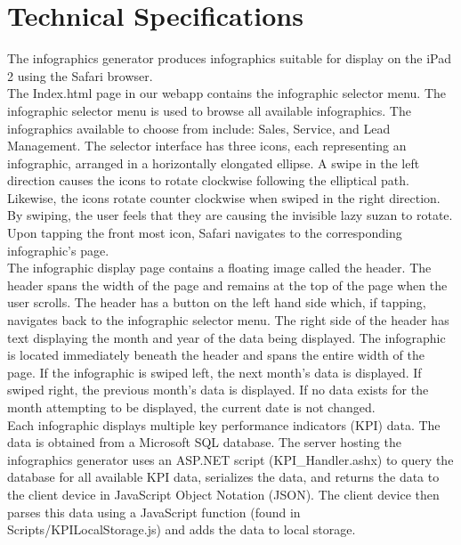 \documentclass[11pt,a4paper,oneside]{article}
\begin{document}
\section{Technical Specifications}

The infographics generator produces infographics suitable for display on the iPad 2 using the Safari browser.\\

The Index.html page in our webapp contains the infographic selector menu. The infographic selector menu is used to browse all available infographics. The infographics available to choose from include: Sales, Service, and Lead Management. The selector interface has three icons, each representing an infographic, arranged in a horizontally elongated ellipse. A swipe in the left direction causes the icons to rotate clockwise following the elliptical path. Likewise, the icons rotate counter clockwise when swiped in the right direction. By swiping, the user feels that they are causing the invisible lazy suzan to rotate. Upon tapping the front most icon, Safari navigates to the corresponding infographic's page.\\

The infographic display page contains a floating image called the header. The header spans the width of the page and remains at the top of the page when the user scrolls. The header has a button on the left hand side which, if tapping, navigates back to the infographic selector menu. The right side of the header has text displaying the month and year of the data being displayed. The infographic is located immediately beneath the header and spans the entire width of the page. If the infographic is swiped left, the next month's data is displayed. If swiped right, the previous month's data is displayed. If no data exists for the month attempting to be displayed, the current date is not changed.\\

Each infographic displays multiple key performance indicators (KPI) data. The data is obtained from a Microsoft SQL database. The server hosting the infographics generator uses an ASP.NET script (KPI\_Handler.ashx) to query the database for all available KPI data, serializes the data, and returns the data to the client device in JavaScript Object Notation (JSON). The client device then parses this data using a JavaScript function (found in Scripts/KPILocalStorage.js) and adds the data to local storage.\\
\end{document}
